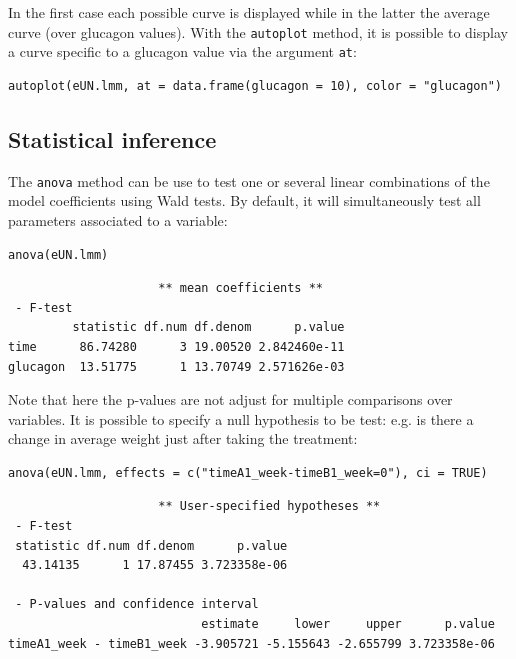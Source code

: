 \documentclass[12pt]{article}
\begin{document}
In the first case each possible curve is displayed while in the latter
the average curve (over glucagon values). With the \texttt{autoplot} method,
it is possible to display a curve specific to a glucagon value via the
argument \texttt{at}:
\lstset{language=r,label= ,caption= ,captionpos=b,numbers=none}
\begin{lstlisting}
autoplot(eUN.lmm, at = data.frame(glucagon = 10), color = "glucagon")
\end{lstlisting}

\subsection{Statistical inference}
\label{sec:org06290e2}

The \texttt{anova} method can be use to test one or several linear
combinations of the model coefficients using Wald tests. By default,
it will simultaneously test all parameters associated to a variable:
\lstset{language=r,label= ,caption= ,captionpos=b,numbers=none}
\begin{lstlisting}
anova(eUN.lmm)
\end{lstlisting}

\begin{verbatim}
                     ** mean coefficients ** 
 - F-test
         statistic df.num df.denom      p.value
time      86.74280      3 19.00520 2.842460e-11
glucagon  13.51775      1 13.70749 2.571626e-03
\end{verbatim}


Note that here the p-values are not adjust for multiple comparisons
over variables. It is possible to specify a null hypothesis to be
test: e.g. is there a change in average weight just after taking the
treatment:
\lstset{language=r,label= ,caption= ,captionpos=b,numbers=none}
\begin{lstlisting}
anova(eUN.lmm, effects = c("timeA1_week-timeB1_week=0"), ci = TRUE)
\end{lstlisting}

\begin{verbatim}
                     ** User-specified hypotheses ** 
 - F-test
 statistic df.num df.denom      p.value
  43.14135      1 17.87455 3.723358e-06

 - P-values and confidence interval 
                           estimate     lower     upper      p.value
timeA1_week - timeB1_week -3.905721 -5.155643 -2.655799 3.723358e-06
\end{verbatim}
\end{document}
